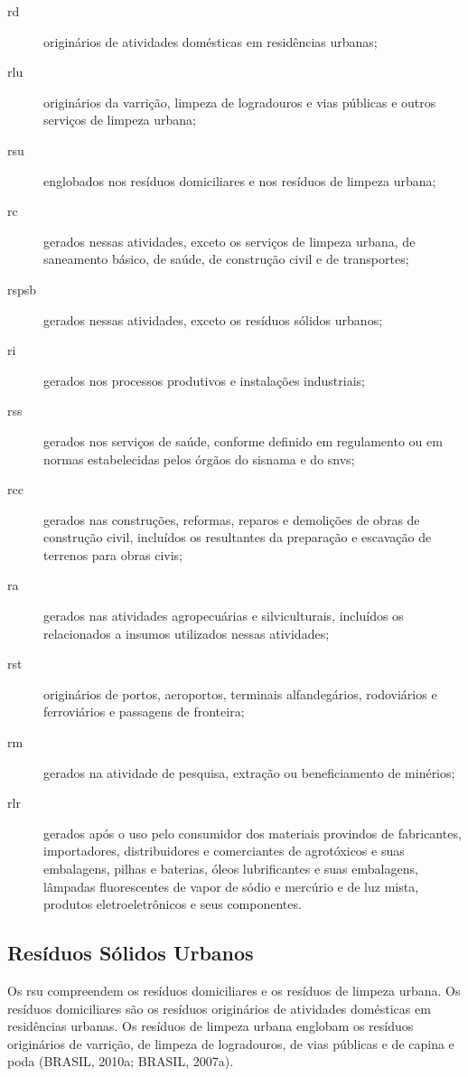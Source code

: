 	\begin{description}
		\item[\gls{rd}] originários de atividades domésticas em residências urbanas;
		\item[\gls{rlu}] originários da varrição, limpeza de logradouros e vias públicas e outros serviços de limpeza urbana;
		\item[\gls{rsu}] englobados nos resíduos domiciliares e nos resíduos de limpeza urbana;
		\item[\gls{rc}] gerados nessas atividades, exceto os serviços de limpeza urbana, de saneamento básico, de saúde, de construção civil e de transportes;
		\item[\gls{rspsb}] gerados nessas atividades, exceto os resíduos sólidos urbanos;
		\item[\gls{ri}] gerados nos processos produtivos e instalações industriais;
		\item[\gls{rss}] gerados nos serviços de saúde, conforme definido em regulamento ou em normas estabelecidas pelos órgãos do \gls{sisnama} e do \gls{snvs};
		\item[\gls{rcc}] gerados nas construções, reformas, reparos e demolições de obras de construção civil, incluídos os resultantes da preparação e escavação de terrenos para obras civis;
		\item[\gls{ra}] gerados nas atividades agropecuárias e silviculturais, incluídos os relacionados a insumos utilizados nessas atividades;
		\item[\gls{rst}] originários de portos, aeroportos, terminais alfandegários, rodoviários e ferroviários e passagens de fronteira;
		\item[\gls{rm}] gerados na atividade de pesquisa, extração ou beneficiamento de minérios;
		\item[\gls{rlr}] gerados após o uso pelo consumidor dos materiais provindos de fabricantes, importadores, distribuidores e comerciantes de agrotóxicos e suas embalagens, pilhas e baterias, óleos lubrificantes e suas embalagens, lâmpadas fluorescentes de vapor de sódio e mercúrio e de luz mista, produtos eletroeletrônicos e seus componentes.
		
	\end{description}
	
	\subsection{Resíduos Sólidos Urbanos}
	Os \gls{rsu} compreendem os resíduos domiciliares e os resíduos de limpeza urbana. Os resíduos domiciliares são os resíduos originários de atividades domésticas em residências urbanas. Os resíduos de limpeza urbana englobam os resíduos originários de varrição, de limpeza de logradouros, de vias públicas e de capina e poda (BRASIL, 2010a; BRASIL, 2007a).
	
